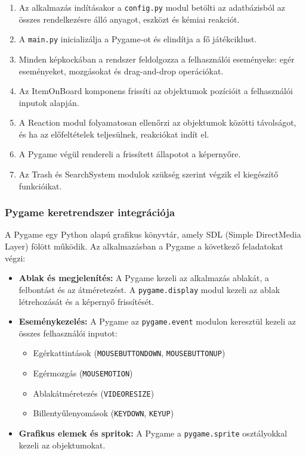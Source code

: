 \documentclass[]{thesis-ekf}
\begin{document}
	\begin{enumerate}
		\item Az alkalmazás indításakor a \texttt{config.py} modul betölti az adatbázisból az összes rendelkezésre álló anyagot, eszközt és kémiai reakciót.
		\item A \texttt{main.py} inicializálja a Pygame-ot és elindítja a fő játékciklust.
		\item Minden képkockában a rendszer feldolgozza a felhasználói eseményeke: egér eseményeket, mozgásokat és drag-and-drop operációkat.
		\item Az ItemOnBoard komponens frissíti az objektumok pozícióit a felhasználói inputok alapján.
		\item A Reaction modul folyamatosan ellenőrzi az objektumok közötti távolságot, és ha az előfeltételek teljesülnek, reakciókat indít el.
		\item A Pygame végül rendereli a frissített állapotot a képernyőre.
		\item Az Trash és SearchSystem modulok szükség szerint végzik el kiegészítő funkcióikat.
	\end{enumerate}
	
	
	\subsubsection{Pygame keretrendszer integrációja}
	
	A Pygame egy Python alapú grafikus könyvtár, amely SDL (Simple DirectMedia Layer) fölött működik. Az alkalmazásban a Pygame a következő feladatokat végzi:
	
	\begin{itemize}
		\item \textbf{Ablak és megjelenítés:} A Pygame kezeli az alkalmazás ablakát, a felbontást és az átméretezést. A \texttt{pygame.display} modul kezeli az ablak létrehozását és a képernyő frissítését.
		
		\item \textbf{Eseménykezelés:} A Pygame az \texttt{pygame.event} modulon keresztül kezeli az összes felhasználói inputot:
		\begin{itemize}
			\item Egérkattintások (\texttt{MOUSEBUTTONDOWN}, \texttt{MOUSEBUTTONUP})
			\item Egérmozgás (\texttt{MOUSEMOTION})
			\item Ablakátméretezés (\texttt{VIDEORESIZE})
			\item Billentyűlenyomások (\texttt{KEYDOWN}, \texttt{KEYUP})
		\end{itemize}
		
		\item \textbf{Grafikus elemek és spritok:} A Pygame a \texttt{pygame.sprite} osztályokkal kezeli az objektumokat.
		
	\end{itemize}
	
\end{document}
